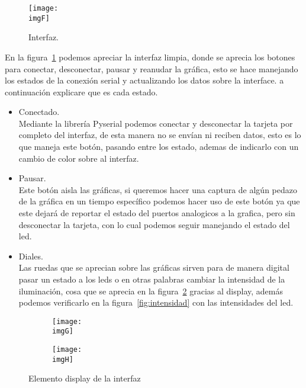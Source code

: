 \documentclass[a4paper,12pt]{article}
\newcommand{\imgF}{img/principal.png}
\newcommand{\imgG}{img/poco.png}
\newcommand{\imgH}{img/mucho.png}
\begin{document}
        \begin{figure}[H] 
            \centering 
            \texttt{[image: \\imgF]} 
            \caption{Interfaz.} 
            \label{fig:F} 
        \end{figure} 

        En la figura~\ref{fig:F} podemos apreciar la interfaz limpia, donde se aprecia los botones para conectar, desconectar, pausar y reanudar la gráfica, esto se hace manejando los estados de la conexión serial y actualizando los datos sobre la interface. a continuación explicare que es cada estado.

        \begin{itemize}
            \item Conectado.\\
            Mediante la librería Pyserial podemos conectar y desconectar la tarjeta por completo del interfaz, de esta manera no se envían ni reciben datos, esto es lo que maneja este botón, pasando entre los estado, ademas de indicarlo con un cambio de color sobre al interfaz.
            \item Pausar.\\
            Este botón aisla las gráficas, si queremos hacer una captura de algún pedazo de la gráfica en un tiempo específico podemos hacer uso de este botón ya que este dejará de reportar el estado del puertos analogicos a la grafica, pero sin desconectar la tarjeta, con lo cual podemos seguir manejando el estado del led.
            \item Diales.\\
            Las ruedas que se aprecian sobre las gráficas sirven para de manera digital pasar un estado a los leds o en otras palabras cambiar la intensidad de la iluminación, cosa que se aprecia en la figura~\ref{fig:display} gracias al display, además podemos verificarlo en la figura~\ref{fig:intensidad}  con las intensidades del led.
        \end{itemize}

        \begin{figure}[H] 
            \centering 
            \begin{subfigure}{0.45\linewidth} 
                \texttt{[image: \\imgG]} 
            \end{subfigure} 
            \begin{subfigure}{0.45\textwidth} 
                \texttt{[image: \\imgH]} 
            \end{subfigure} 
            \caption{Elemento display de la interfaz} 
            \label{fig:display}
        \end{figure} 
\end{document}
